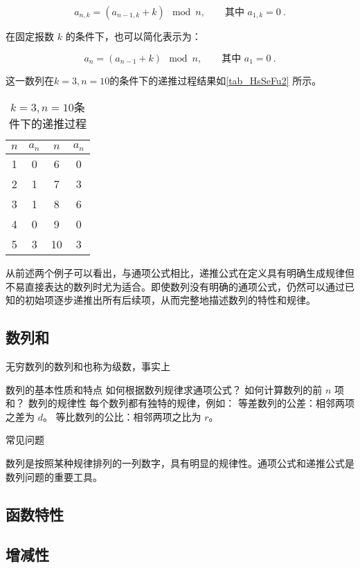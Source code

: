\begin{equation}
a_{n,k} = (a_{n-1,k} + k) \mod n, \qquad \text{其中 } a_{1,k} = 0~.
\end{equation}

在固定报数 $k$ 的条件下，也可以简化表示为：

\begin{equation}
a_n = (a_{n-1} + k) \mod n, \qquad \text{其中 } a_{1} = 0~.
\end{equation}

这一数列在$k=3,n=10$的条件下的递推过程结果如\autoref{tab_HsSeFu2} 所示。
\begin{table}[ht]
\centering
\caption{$k=3,n=10$条件下的递推过程}\label{tab_HsSeFu2}
\begin{tabular}{|c|c|c|c|}
\hline
$n$ & $a_n$ & $n$ & $a_n$ \\
\hline
1 & 0 & 6 & 0 \\
\hline
2 & 1 & 7 & 3 \\
\hline
3 & 1 & 8 & 6 \\
\hline
4 & 0 & 9 & 0 \\
\hline
5 & 3 & 10 & 3 \\
\hline
\end{tabular}
\end{table}
从前述两个例子可以看出，与通项公式相比，递推公式在定义具有明确生成规律但不易直接表达的数列时尤为适合。即使数列没有明确的通项公式，仍然可以通过已知的初始项逐步递推出所有后续项，从而完整地描述数列的特性和规律。

\subsection{数列和}

无穷数列的数列和也称为级数，事实上


数列的基本性质和特点
如何根据数列规律求通项公式？
如何计算数列的前 $n$ 项和？
数列的规律性
每个数列都有独特的规律，例如：
等差数列的公差：相邻两项之差为 $d$。
等比数列的公比：相邻两项之比为 $r$。

常见问题


数列是按照某种规律排列的一列数字，具有明显的规律性。通项公式和递推公式是数列问题的重要工具。
\subsection{函数特性}

\subsection{增减性}

